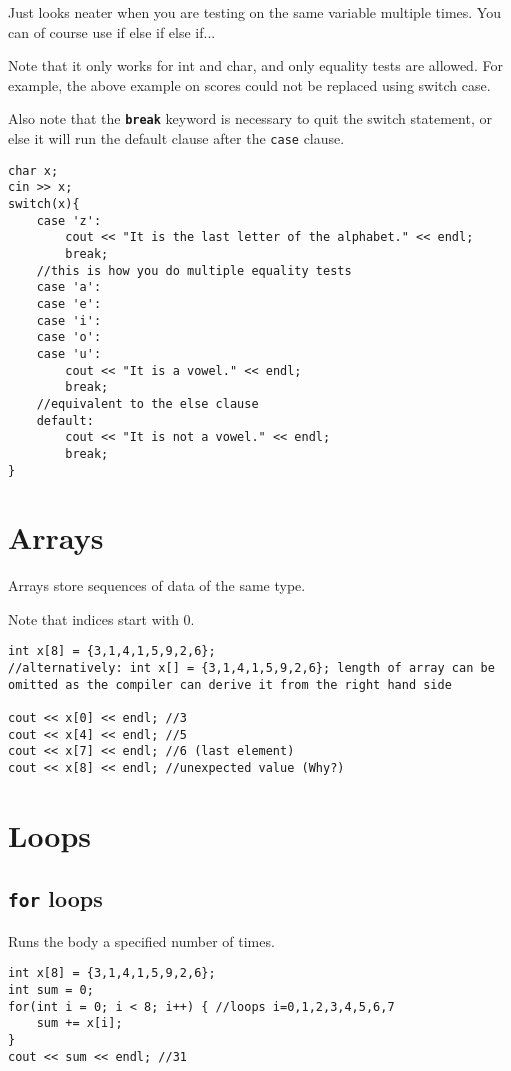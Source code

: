 Just looks neater when you are testing on the same variable multiple times. You can of course use if else if else if... 

Note that it only works for int and char, and only equality tests are allowed. For example, the above example on scores could not be replaced using switch case.

Also note that the \textbf{\texttt{break}} keyword is necessary to quit the switch statement, or else it will run the default clause after the \texttt{case} clause.

\begin{lstlisting}
char x;
cin >> x;
switch(x){
    case 'z':
        cout << "It is the last letter of the alphabet." << endl;
        break;
    //this is how you do multiple equality tests
    case 'a':
    case 'e':
    case 'i':
    case 'o':
    case 'u':
        cout << "It is a vowel." << endl;
        break;
    //equivalent to the else clause
    default:
        cout << "It is not a vowel." << endl;
        break;
}
\end{lstlisting}

\section{Arrays}
Arrays store sequences of data of the same type.

Note that indices start with 0.

\begin{lstlisting}
int x[8] = {3,1,4,1,5,9,2,6};
//alternatively: int x[] = {3,1,4,1,5,9,2,6}; length of array can be omitted as the compiler can derive it from the right hand side

cout << x[0] << endl; //3 
cout << x[4] << endl; //5
cout << x[7] << endl; //6 (last element)
cout << x[8] << endl; //unexpected value (Why?)
\end{lstlisting}

\section{Loops}
\subsection{\texttt{for} loops}
Runs the body a specified number of times.

\begin{lstlisting}
int x[8] = {3,1,4,1,5,9,2,6};
int sum = 0;
for(int i = 0; i < 8; i++) { //loops i=0,1,2,3,4,5,6,7
    sum += x[i];
}
cout << sum << endl; //31
\end{lstlisting}

